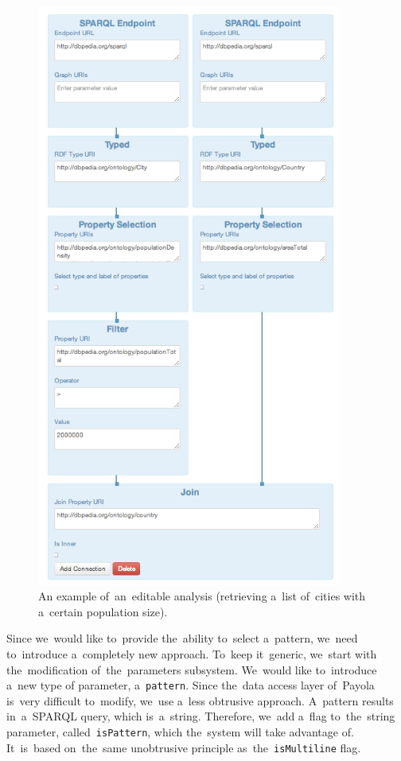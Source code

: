 \begin{figure}
  \centering
    \includegraphics[width=100mm]{img/editable-analysis.png}
  \caption{An example of~an~editable analysis (retrieving a~list of~cities with a~certain population size).}
  \label{fig:example-analysis-editable}
\end{figure}

Since we~would like to~provide the~ability to~select a~pattern, we~need to~introduce a~completely new approach. To~keep it~generic, we~start with the~modification of~the~parameters subsystem. We~would like to~introduce a~new type 
of parameter, a~\texttt{pattern}. Since the~data access layer of~Payola is~very 
difficult to~modify, we~use a~less obtrusive approach. A~pattern results in~a~SPARQL query, which is~a~string. Therefore, we~add a~flag to~the~string 
parameter, called~\texttt{isPattern}, which the~system will take advantage of. It~is~based on~the~same unobtrusive principle as~the~\texttt{isMultiline} flag.

